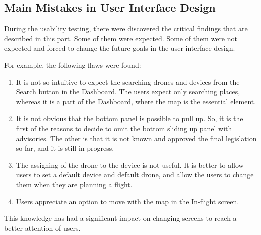 \subsection{Main Mistakes in User Interface Design}\label{subsec:main-mistakes-in-ui-design}
During the usability testing, there were discovered the critical findings that are described in this part.
Some of them were expected.
Some of them were not expected and forced to change the future goals in the user interface design.

For example, the following flaws were found:
\begin{enumerate}
    \item It is not so intuitive to expect the searching drones and devices from the Search button in the Dashboard.
    The users expect only searching places, whereas it is a part of the Dashboard, where the map is the essential element.
    \item It is not obvious that the bottom panel is possible to pull up.
    So, it is the first of the reasons to decide to omit the bottom sliding up panel with advisories.
    The other is that it is not known and approved the final legislation so far, and it is still in progress.
    \item The assigning of the drone to the device is not useful.
    It is better to allow users to set a default device and default drone, and allow the users to change them when they are planning a flight.
    \item Users appreciate an option to move with the map in the In-flight screen.
\end{enumerate}
This knowledge has had a significant impact on changing screens to reach a better attention of users.
